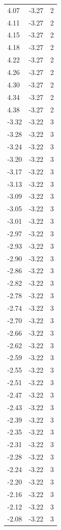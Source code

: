 \begin{longtable}{lrr}
  4.07 & -3.27 & 2 \\
  4.11 & -3.27 & 2 \\
  4.15 & -3.27 & 2 \\
  4.18 & -3.27 & 2 \\
  4.22 & -3.27 & 2 \\
  4.26 & -3.27 & 2 \\
  4.30 & -3.27 & 2 \\
  4.34 & -3.27 & 2 \\
  4.38 & -3.27 & 2 \\
  -3.32 & -3.22 & 3 \\
  -3.28 & -3.22 & 3 \\
  -3.24 & -3.22 & 3 \\
  -3.20 & -3.22 & 3 \\
  -3.17 & -3.22 & 3 \\
  -3.13 & -3.22 & 3 \\
  -3.09 & -3.22 & 3 \\
  -3.05 & -3.22 & 3 \\
  -3.01 & -3.22 & 3 \\
  -2.97 & -3.22 & 3 \\
  -2.93 & -3.22 & 3 \\
  -2.90 & -3.22 & 3 \\
  -2.86 & -3.22 & 3 \\
  -2.82 & -3.22 & 3 \\
  -2.78 & -3.22 & 3 \\
  -2.74 & -3.22 & 3 \\
  -2.70 & -3.22 & 3 \\
  -2.66 & -3.22 & 3 \\
  -2.62 & -3.22 & 3 \\
  -2.59 & -3.22 & 3 \\
  -2.55 & -3.22 & 3 \\
  -2.51 & -3.22 & 3 \\
  -2.47 & -3.22 & 3 \\
  -2.43 & -3.22 & 3 \\
  -2.39 & -3.22 & 3 \\
  -2.35 & -3.22 & 3 \\
  -2.31 & -3.22 & 3 \\
  -2.28 & -3.22 & 3 \\
  -2.24 & -3.22 & 3 \\
  -2.20 & -3.22 & 3 \\
  -2.16 & -3.22 & 3 \\
  -2.12 & -3.22 & 3 \\
  -2.08 & -3.22 & 3 \\

\end{longtable}

